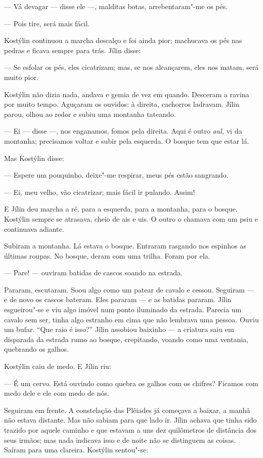 --- Vá devagar --- disse ele ---, malditas botas, arrebentaram"-me os
pés.

--- Pois tire, será mais fácil.

Kostýlin continuou a marcha descalço e foi ainda pior; machucava os pés
nas pedras e ficava sempre para trás. Jílin disse:

--- Se esfolar os pés, eles cicatrizam; mas, se nos alcançarem, eles nos
matam, será muito pior.

Kostýlin não dizia nada, andava e gemia de vez em quando. Desceram a
ravina por muito tempo. Aguçaram os ouvidos: à direita, cachorros
ladravam. Jílin parou, olhou ao redor e subiu uma montanha tateando.

--- Ei --- disse ---, nos enganamos, fomos pela direita. Aqui é outro
\emph{aul,} vi da montanha; precisamos voltar e subir pela esquerda. O
bosque tem que estar lá.

Mas Kostýlin disse:

--- Espere um pouquinho, deixe"-me respirar, meus pés estão sangrando.

--- Ei, meu velho, vão cicatrizar; mais fácil ir pulando. Assim!

E Jílin deu marcha a ré, para a esquerda, para a montanha, para o
bosque. Kostýlin sempre se atrasava, cheio de ais e uis. O outro o
chamava com um psiu e continuava adiante.

Subiram a montanha. Lá estava o bosque. Entraram rasgando nos espinhos
as últimas roupas. No bosque, deram com uma trilha. Foram por ela.

--- Pare! --- ouviram batidas de cascos soando na estrada.

Pararam, escutaram. Soou algo como um patear de cavalo e cessou.
Seguiram --- e de novo os cascos bateram. Eles pararam --- e as batidas
pararam. Jílin esgueirou"-se e viu algo imóvel num ponto iluminado da
estrada. Parecia um cavalo sem ser, tinha algo estranho em cima que não
lembrava uma pessoa. Ouviu um bufar. ``Que raio é isso?'' Jílin assobiou
baixinho --- a criatura saiu em disparada da estrada rumo ao bosque,
crepitando, voando como uma ventania, quebrando os galhos.

Kostýlin caiu de medo. E Jílin riu:

--- É um cervo. Está ouvindo como quebra os galhos com os chifres?
Ficamos com medo dele e ele com medo de nós.

Seguiram em frente. A constelação das Plêiades já começava a baixar, a
manhã não estava distante. Mas não sabiam para que lado ir. Jílin achava
que tinha sido trazido por aquele caminho e que estavam a uns dez
quilômetros de distância dos seus irmãos; mas nada indicava isso e de
noite não se distinguem as coisas. Saíram para uma clareira. Kostýlin
sentou"-se:

